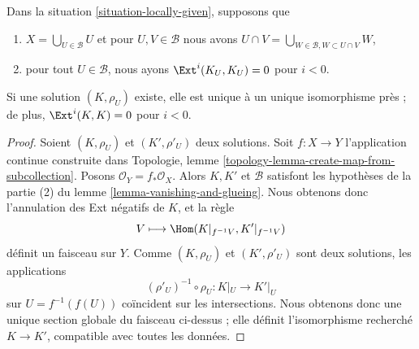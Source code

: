 {\begin{lemma}

\label{lemma-uniqueness}
Dans la situation \ref{situation-locally-given}, supposons que
\begin{enumerate}
\item $X = \bigcup_{U \in \mathcal{B}} U$ et pour $U, V \in \mathcal{B}$ nous avons $U \cap V = \bigcup_{W \in \mathcal{B}, W \subset U \cap V} W$,
\item pour tout $U \in \mathcal{B}$, nous ayons $\Ext^i(K_U, K_U) = 0$ pour $i < 0$.
\end{enumerate}
Si une solution $(K, \rho_U)$ existe, elle est unique à un unique isomorphisme près ; de plus, $\Ext^i(K, K) = 0$ pour $i < 0$.
\end{lemma}

\begin{proof}

Soient $(K, \rho_U)$ et $(K', \rho'_U)$ deux solutions. Soit $f : X \to Y$ l'application continue construite dans Topologie, lemme \ref{topology-lemma-create-map-from-subcollection}. Posons $\mathcal{O}_Y = f_*\mathcal{O}_X$. Alors $K, K'$ et $\mathcal{B}$ satisfont les hypothèses de la partie (2) du lemme \ref{lemma-vanishing-and-glueing}. Nous obtenons donc l'annulation des Ext négatifs de $K$, et la règle
$$
V \longmapsto \Hom(K|_{f^{-1}V}, K'|_{f^{-1}V})
$$
définit un faisceau sur $Y$. Comme $(K, \rho_U)$ et $(K', \rho'_U)$ sont deux solutions, les applications
$$
(\rho'_U)^{-1} \circ \rho_U : K|_U \longrightarrow K'|_U
$$
sur $U = f^{-1}(f(U))$ coïncident sur les intersections. Nous obtenons donc une unique section globale du faisceau ci-dessus ; elle définit l'isomorphisme recherché
$K \to K'$, compatible avec toutes les données.

\end{proof}

\begin{remark}

\label{remark-uniqueness}


\end{remark}}
